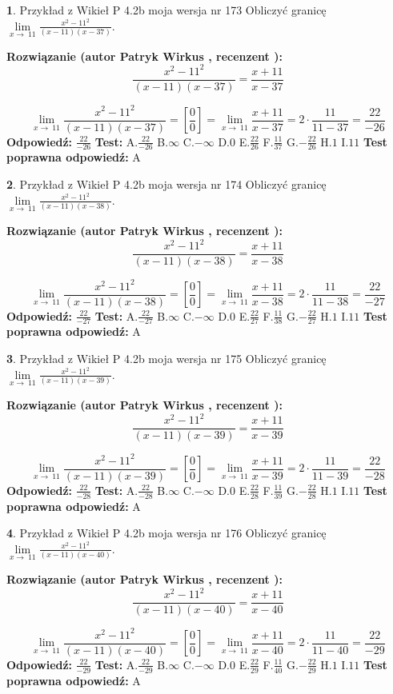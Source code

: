 \documentclass[12pt, a4paper]{article}
\theoremstyle{definition} %
\newtheorem{zad}{}
\newcommand{\zadStart}[1]{\begin{zad}#1\newline}
\newcommand{\zadStop}{\end{zad}}
\newcommand{\rozwStart}[2]{\noindent \textbf{Rozwiązanie (autor #1 , recenzent #2): }\newline}
\newcommand{\rozwStop}{\newline}
\newcommand{\odpStart}{\noindent \textbf{Odpowiedź:}\newline}
\newcommand{\odpStop}{\newline}
\newcommand{\testStart}{\noindent \textbf{Test:}\newline}
\newcommand{\testStop}{\newline}
\newcommand{\kluczStart}{\noindent \textbf{Test poprawna odpowiedź:}\newline}
\newcommand{\kluczStop}{\newline}
\begin{document}
\zadStart{Przykład z Wikieł P 4.2b moja wersja nr 173}
Obliczyć granicę $\lim\limits_{x\to\ 11}\frac{x^{2}-11^{2}}{(x-11)(x-37)}$.
\zadStop
\rozwStart{Patryk Wirkus}{}
$$\frac{x^{2}-11^{2}}{(x-11)(x-37)}=\frac{x+11}{x-37}$$

$$\lim\limits_{x\to\ 11}\frac{x^{2}-11^{2}}{(x-11)(x-37)}=[\frac{0}{0}]=\lim\limits_{x\to\ 11}\frac{x+11}{x-37}=2 \cdot \frac{11}{11-37} = \frac{22}{-26}$$
\rozwStop
\odpStart
$\frac{22}{-26}$
\odpStop
\testStart
A.$\frac{22}{-26}$
B.$\infty$
C.$-\infty$
D.$0$
E.$\frac{22}{26}$
F.$\frac{11}{37}$
G.$-\frac{22}{26}$
H.$1$
I.$11$
\testStop
\kluczStart
A
\kluczStop



\zadStart{Przykład z Wikieł P 4.2b moja wersja nr 174}
Obliczyć granicę $\lim\limits_{x\to\ 11}\frac{x^{2}-11^{2}}{(x-11)(x-38)}$.
\zadStop
\rozwStart{Patryk Wirkus}{}
$$\frac{x^{2}-11^{2}}{(x-11)(x-38)}=\frac{x+11}{x-38}$$

$$\lim\limits_{x\to\ 11}\frac{x^{2}-11^{2}}{(x-11)(x-38)}=[\frac{0}{0}]=\lim\limits_{x\to\ 11}\frac{x+11}{x-38}=2 \cdot \frac{11}{11-38} = \frac{22}{-27}$$
\rozwStop
\odpStart
$\frac{22}{-27}$
\odpStop
\testStart
A.$\frac{22}{-27}$
B.$\infty$
C.$-\infty$
D.$0$
E.$\frac{22}{27}$
F.$\frac{11}{38}$
G.$-\frac{22}{27}$
H.$1$
I.$11$
\testStop
\kluczStart
A
\kluczStop



\zadStart{Przykład z Wikieł P 4.2b moja wersja nr 175}
Obliczyć granicę $\lim\limits_{x\to\ 11}\frac{x^{2}-11^{2}}{(x-11)(x-39)}$.
\zadStop
\rozwStart{Patryk Wirkus}{}
$$\frac{x^{2}-11^{2}}{(x-11)(x-39)}=\frac{x+11}{x-39}$$

$$\lim\limits_{x\to\ 11}\frac{x^{2}-11^{2}}{(x-11)(x-39)}=[\frac{0}{0}]=\lim\limits_{x\to\ 11}\frac{x+11}{x-39}=2 \cdot \frac{11}{11-39} = \frac{22}{-28}$$
\rozwStop
\odpStart
$\frac{22}{-28}$
\odpStop
\testStart
A.$\frac{22}{-28}$
B.$\infty$
C.$-\infty$
D.$0$
E.$\frac{22}{28}$
F.$\frac{11}{39}$
G.$-\frac{22}{28}$
H.$1$
I.$11$
\testStop
\kluczStart
A
\kluczStop



\zadStart{Przykład z Wikieł P 4.2b moja wersja nr 176}
Obliczyć granicę $\lim\limits_{x\to\ 11}\frac{x^{2}-11^{2}}{(x-11)(x-40)}$.
\zadStop
\rozwStart{Patryk Wirkus}{}
$$\frac{x^{2}-11^{2}}{(x-11)(x-40)}=\frac{x+11}{x-40}$$

$$\lim\limits_{x\to\ 11}\frac{x^{2}-11^{2}}{(x-11)(x-40)}=[\frac{0}{0}]=\lim\limits_{x\to\ 11}\frac{x+11}{x-40}=2 \cdot \frac{11}{11-40} = \frac{22}{-29}$$
\rozwStop
\odpStart
$\frac{22}{-29}$
\odpStop
\testStart
A.$\frac{22}{-29}$
B.$\infty$
C.$-\infty$
D.$0$
E.$\frac{22}{29}$
F.$\frac{11}{40}$
G.$-\frac{22}{29}$
H.$1$
I.$11$
\testStop
\kluczStart
A
\kluczStop
\end{document}
